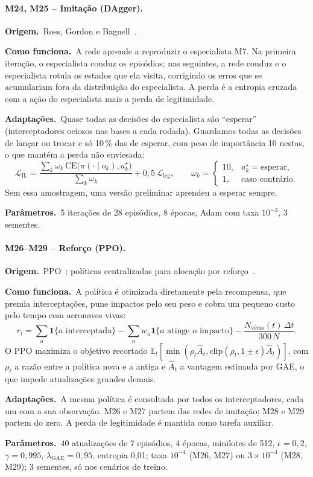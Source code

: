 \documentclass[11pt,a4paper]{article}
\newcommand{\orig}{\par\noindent\textbf{Origem.}~}
\newcommand{\func}{\par\noindent\textbf{Como funciona.}~}
\newcommand{\adap}{\par\noindent\textbf{Adaptações.}~}
\newcommand{\parm}{\par\noindent\textbf{Parâmetros.}~}
\begin{document}
\paragraph{M24, M25 -- Imitação (DAgger).}
\orig Ross, Gordon e Bagnell~\cite{ross2011}.
\func A rede aprende a reproduzir o especialista M7. Na primeira iteração, o especialista conduz os episódios; nas
seguintes, a rede conduz e o especialista rotula os estados que ela visita, corrigindo os erros que se acumulariam fora
da distribuição do especialista. A perda é a entropia cruzada com a ação do especialista mais a perda de legitimidade.
\adap Quase todas as decisões do especialista são ``esperar'' (interceptadores ociosos nas bases a cada rodada). Guardamos
todas as decisões de lançar ou trocar e só 10\,\% das de esperar, com peso de importância 10 nestas, o que mantém a perda
não enviesada:
\begin{equation}
  \mathcal{L}_{\mathrm{IL}}=\frac{\sum_k\omega_k\,\mathrm{CE}\big(\pi(\cdot\mid o_k),a^\star_k\big)}{\sum_k\omega_k}
  +0{,}5\,\mathcal{L}_{\mathrm{leg}},\qquad\omega_k=\begin{cases}10,&a^\star_k=\text{esperar},\\1,&\text{caso contrário.}\end{cases}
\end{equation}
Sem essa amostragem, uma versão preliminar aprendeu a esperar sempre.
\parm 5 iterações de 28 episódios, 8 épocas, Adam com taxa $10^{-3}$, 3 sementes.

\paragraph{M26--M29 -- Reforço (PPO).}
\orig PPO~\cite{schulman2017}; políticas centralizadas para alocação por reforço~\cite{liu2023drones,palmas2025,jia2026}.
\func A política é otimizada diretamente pela recompensa, que premia interceptações, pune impactos pelo seu peso e cobra
um pequeno custo pelo tempo com aeronaves vivas:
\begin{equation}
  r_t = \sum_{a}\mathbf{1}\{a\text{ interceptada}\} - \sum_a w_a\mathbf{1}\{a\text{ atinge o impacto}\}
  - \frac{N_{\mathrm{vivas}}(t)\,\Delta t}{300\,N}.
\end{equation}
O PPO maximiza o objetivo recortado
$\mathbb{E}_t[\min(\rho_t\hat A_t,\mathrm{clip}(\rho_t,1\pm\epsilon)\hat A_t)]$, com $\rho_t$ a razão entre a política nova e
a antiga e $\hat A_t$ a vantagem estimada por GAE, o que impede atualizações grandes demais.
\adap A mesma política é consultada por todos os interceptadores, cada um com a sua observação. M26 e M27 partem das redes
de imitação; M28 e M29 partem do zero. A perda de legitimidade é mantida como tarefa auxiliar.
\parm 40 atualizações de 7 episódios, 4 épocas, minilotes de 512, $\epsilon=0{,}2$, $\gamma=0{,}995$, $\lambda_{\mathrm{GAE}}=0{,}95$,
entropia 0{,}01; taxa $10^{-4}$ (M26, M27) ou $3\times10^{-4}$ (M28, M29); 3 sementes, só nos cenários de treino.
\end{document}

